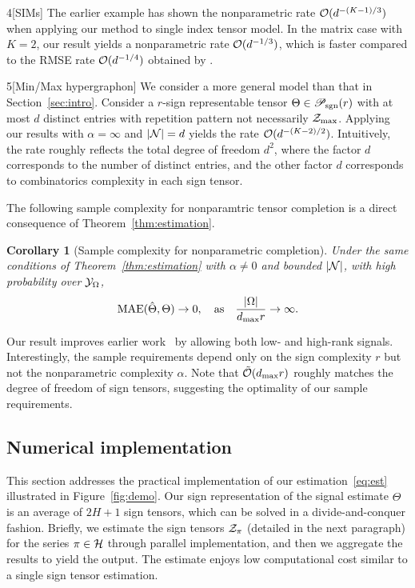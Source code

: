 \documentclass[useAMS,usenatbib,usegraphicx,referee]{biom}
\theoremstyle{plain}
\newtheorem{cor}{Corollary}
\theoremstyle{definition}
\def\caliP{\mathscr{P}_{\textup{sgn}}}
\begin{document}
\begin{customexample}{4}[SIMs]
The earlier example has shown the nonparametric rate $\mathcal{O}(d^{-(K-1)/3})$ when applying our method to single index tensor model. In the matrix case with $K=2$, our result yields a nonparametric rate $\mathcal{O}(d^{-1/3})$, which is faster compared to the RMSE rate $\mathcal{O}(d^{-1/4})$ obtained by \cite{ganti2015matrix}. 

\end{customexample}

\begin{customexample}{5}[Min/Max hypergraphon]
We consider a more general model than that in Section~\ref{sec:intro}. Consider a $r$-sign representable tensor $\Theta\in \caliP(r)$ with at most $d$ distinct entries with repetition pattern not necessarily $\mathcal{Z}_{\max}$. Applying our results with $\alpha=\infty$ and $|\mathcal{N}|=d$ yields the rate $\mathcal{O}(d^{-(K-2)/2})$. Intuitively, the rate roughly reflects the total degree of freedom $d^2$, where the factor $d$ corresponds to the number of distinct entries, and the other factor $d$ corresponds to combinatorics complexity in each sign tensor. 
\end{customexample}

The following sample complexity for nonparamtric tensor completion is a direct consequence of Theorem~\ref{thm:estimation}. 
\vspace{-.3cm}

\begin{cor}[Sample complexity for nonparametric completion] Under the same conditions of Theorem~\ref{thm:estimation} with $\alpha\neq 0$ and bounded $|\mathcal{N}|$, with high probability over $\mathcal{Y}_\Omega$, 
\[
\textup{MAE}(\hat \Theta, \Theta)\to 0, \quad \text{as}\quad {|\Omega|\over {d_{\max}} r}\to \infty.
\]
\end{cor}
Our result improves earlier work~\citep{yuan2016tensor,ghadermarzy2019near,pmlr-v119-lee20i} by allowing both low- and high-rank signals. Interestingly, the sample requirements depend only on the sign complexity $r$ but not the nonparametric complexity $\alpha$. Note that $\tilde {\mathcal{O}}(d_{\max}r)$ roughly matches the degree of freedom of sign tensors, suggesting the optimality of our sample requirements. 

\subsection{Numerical implementation}
This section addresses the practical implementation of our estimation~\eqref{eq:est} illustrated in Figure~\ref{fig:demo}. Our sign representation of the signal estimate $\hat \Theta$ is an average of $2H+1$ sign tensors, which can be solved in a divide-and-conquer fashion. Briefly, we estimate the sign tensors $\mathcal{Z}_\pi$ (detailed in the next paragraph) for the series $\pi \in \mathcal{H}$ through parallel implementation, and then we aggregate the results to yield the output. The estimate enjoys low computational cost similar to a single sign tensor estimation.  
\end{document}

